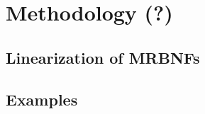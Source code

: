 
\chapter{Methodology (?)}
\label{chapter:methodology}

  \section{Linearization of MRBNFs}

    
  \section{Examples}
